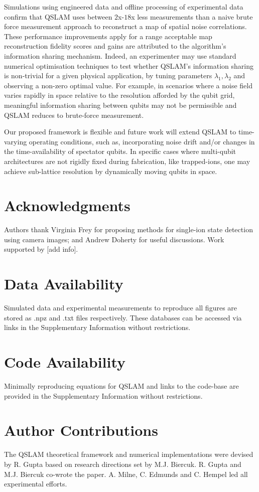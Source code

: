 \documentclass[reprint,longbibliography]{revtex4-1} %
\begin{document}
Simulations using engineered data and offline processing of experimental data confirm that QSLAM uses between $2$x-$18$x less measurements than a naive brute force measurement approach to reconstruct a map of spatial noise correlations. These performance improvements apply for a range acceptable map reconstruction fidelity scores and gains are attributed to the algorithm's information sharing mechanism. Indeed, an experimenter may use standard numerical optimisation techniques to test whether QSLAM's information sharing is non-trivial for a given physical application, by tuning parameters $\lambda_1, \lambda_2$ and observing a non-zero optimal value. For example, in scenarios where a noise field varies rapidly in space relative to the resolution afforded by the qubit grid, meaningful information sharing between qubits may not be permissible and QSLAM reduces to brute-force measurement.

Our proposed framework is flexible and future work will extend QSLAM to time-varying operating conditions, such as, incorporating noise drift and/or changes in the time-availability of spectator qubits.  In specific cases where multi-qubit architectures are not rigidly fixed during fabrication, like trapped-ions, one may achieve sub-lattice resolution by dynamically moving qubits in space. 

\section{Acknowledgments}
Authors thank Virginia Frey for proposing methods for single-ion state detection using camera images; and Andrew Doherty for useful discussions. Work supported by [add info].

\section{Data Availability}
Simulated data and experimental measurements to reproduce all figures are stored as .npz and .txt files respectively. These databases can be accessed via links in the Supplementary Information without restrictions.

\section{Code Availability}
Minimally reproducing equations for QSLAM and links to the code-base are provided in the Supplementary Information without restrictions.

\section{Author Contributions}
The QSLAM theoretical framework and numerical implementations were devised by R. Gupta based on research directions set by M.J. Biercuk. R. Gupta and M.J. Biercuk co-wrote the paper. A. Milne, C. Edmunds and C. Hempel led all experimental efforts.
\end{document}
